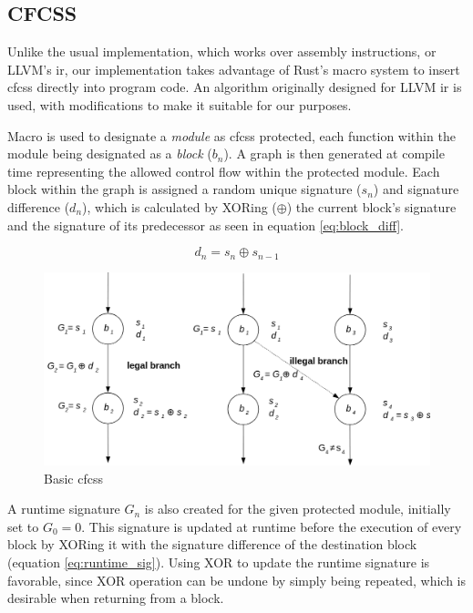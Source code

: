 \subsection{CFCSS}

Unlike the usual implementation, which works over assembly instructions, or LLVM's \acrfull{ir}, our implementation takes advantage of Rust's macro system to insert \acrshort{cfcss} directly into program code. An algorithm originally designed for LLVM \acrshort{ir} \cite{coast:cfcss} is used, with modifications to make it suitable for our purposes.

Macro is used to designate a \textit{module} as \acrshort{cfcss} protected, each function within the module being designated as a \textit{block} ({$b_n$}). A graph is then generated at compile time representing the allowed control flow within the protected module. Each block within the graph is assigned a random unique signature ({$s_n$}) and signature difference ({$d_n$}), which is calculated by XORing ({$\oplus$}) the current block's signature and the signature of its predecessor as seen in equation \ref{eq:block_diff}.

\begin{equation}
d_n = s_n \oplus s_{n-1}
\label{eq:block_diff}
\end{equation}

\begin{figure}[!h]
    \centering
    \includegraphics[width=1.0\textwidth]{diagrams/cfcss/basic.png}
    \caption{Basic \acrshort{cfcss} \cite{coast:cfcss}}
\end{figure}

A runtime signature {$G_n$} is also created for the given protected module, initially set to {$G_0 = 0$}. This signature is updated at runtime before the execution of every block by XORing it with the signature difference of the destination block (equation \ref{eq:runtime_sig}). Using XOR to update the runtime signature is favorable, since XOR operation can be undone by simply being repeated, which is desirable when returning from a block.

